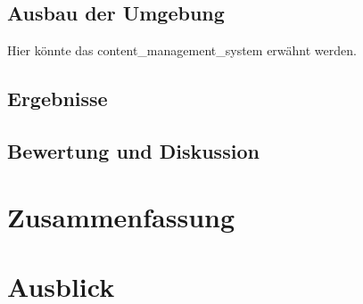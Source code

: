 \section{Ausbau der Umgebung}
Hier könnte das \Gls{content_management_system} erwähnt werden.
\section{Ergebnisse}
\section{Bewertung und Diskussion}

\chapter{Zusammenfassung}

\chapter{Ausblick}

